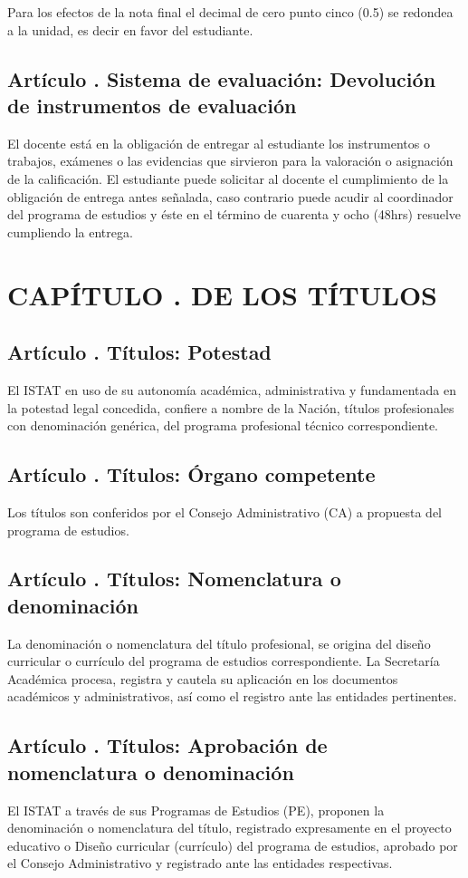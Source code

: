Para los efectos de la nota final el decimal de cero punto cinco (0.5) se redondea a la unidad, es decir en favor del estudiante.  
\subsection{Artículo . Sistema de evaluación: Devolución de instrumentos de evaluación}
\addtocounter{ns}{1}
El docente está en la obligación de entregar al estudiante los instrumentos o trabajos, exámenes o las evidencias que sirvieron para la valoración o asignación de la calificación. El estudiante puede solicitar al docente el cumplimiento de la obligación de entrega antes señalada, caso contrario puede acudir al coordinador del programa de estudios y éste en el término de cuarenta y ocho (48hrs) resuelve cumpliendo la entrega. 
\section{CAPÍTULO . DE LOS TÍTULOS}
\addtocounter{re}{1}

\subsection{Artículo . Títulos: Potestad}
\addtocounter{ns}{1}
El ISTAT en uso de su autonomía académica, administrativa y fundamentada en la potestad legal concedida, confiere a nombre de la Nación, títulos profesionales con denominación genérica, del programa profesional técnico correspondiente.  
\subsection{Artículo . Títulos: Órgano competente}
\addtocounter{ns}{1}
Los títulos son conferidos  por el Consejo Administrativo (CA) a propuesta del programa de estudios.  
\subsection{Artículo . Títulos: Nomenclatura o denominación}
\addtocounter{ns}{1}
La denominación o nomenclatura del título profesional, se origina del diseño curricular o currículo del programa de estudios correspondiente. La Secretaría Académica procesa, registra y cautela su aplicación en los documentos académicos y administrativos, así como el registro ante las entidades pertinentes. 
\subsection{Artículo . Títulos: Aprobación de nomenclatura o denominación}
\addtocounter{ns}{1}
El ISTAT a través de sus Programas de Estudios (PE), proponen la denominación o nomenclatura del título, registrado expresamente en el proyecto educativo o Diseño curricular (currículo) del programa de estudios, aprobado por el Consejo Administrativo y registrado ante las entidades respectivas. 
